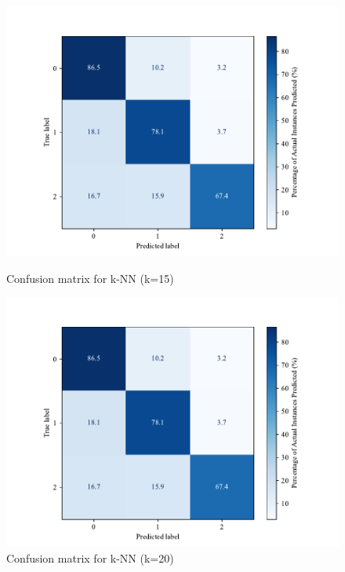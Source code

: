 \begin{figure}[H]
    \centering
    \begin{minipage}[b]{0.45\textwidth}
        \centering
        \includegraphics[width=\textwidth]{images/confusion_matrix_knn15.pdf}
        \caption{Confusion matrix for k-NN (k=15)}
        \label{fig:confusion_knn_15}
    \end{minipage}
    \hfill
    \begin{minipage}[b]{0.45\textwidth}
        \centering
        \includegraphics[width=\textwidth]{images/confusion_matrix_knn20.pdf}
        \caption{Confusion matrix for k-NN (k=20)}
        \label{fig:confusion_knn_20}
    \end{minipage}
\end{figure}

